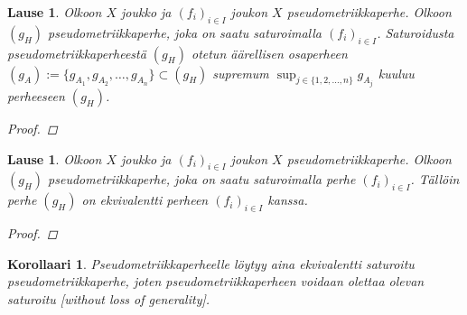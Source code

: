 \documentclass[12pt,a4paper,leqno]{report}
\newcommand{\R}{\mathbb{R}}
\theoremstyle{plain}
\newtheorem{lause}[equation]{Lause}
\newtheorem{kor}[equation]{Korollaari}
\theoremstyle{definition}
\theoremstyle{remark}
\begin{document}
\begin{lause}\label{saturoitu lause}
Olkoon $X$ joukko ja $(f_i)_{i\in I} $ joukon $X$ pseudometriikkaperhe. 
Olkoon $(g_{H})$ pseudometriikkaperhe, joka on saatu saturoimalla $(f_{i})_{i\in I}$. 
Saturoidusta pseudometriikkaperheestä $(g_{H})$ otetun 
äärellisen osaperheen 
$(g_A):=\{g_{A_1},g_{A_2},\dots,g_{A_n}\}\subset (g_{H})$ supremum 
$\sup_{j\in \{1,2,\dots , n\}}g_{A_j}$ 
kuuluu perheeseen $(g_H)$. 
\begin{proof}
\end{proof}
\end{lause}
\begin{lause}
Olkoon $X$ joukko ja $(f_i)_{i\in I} $ joukon $X$ pseudometriikkaperhe. 
Olkoon $(g_H) $ pseudometriikkaperhe, 
joka on saatu saturoimalla perhe $(f_i)_{i\in I} $. 
Tällöin perhe $(g_H) $ on ekvivalentti 
perheen $(f_i)_{i\in I}$ kanssa.
\begin{proof}
\end{proof}
\end{lause}
\begin{kor}\label{saturoitu oletus}
Pseudometriikkaperheelle löytyy aina ekvivalentti saturoitu pseudometriikkaperhe, 
joten pseudometriikkaperheen voidaan olettaa olevan saturoitu 
[without loss of generality].
\end{kor}
\end{document}

